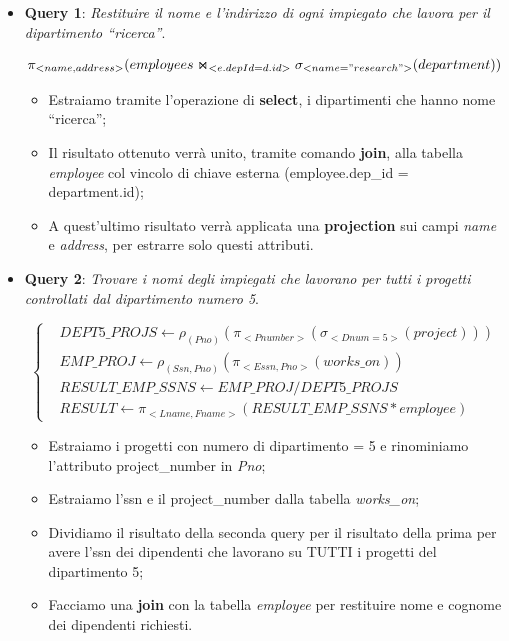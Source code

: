 \begin{itemize}

\item{\textbf{Query 1}}: \textit{Restituire il nome e l’indirizzo di ogni impiegato che lavora per il dipartimento “ricerca”}.

\[	
	\pi_{<name,address>}(employees \Join_{<e.depId=d.id>}\sigma_{<name="research">}(department))
\]

\begin{itemize}

\item Estraiamo tramite l’operazione di \textbf{select}, i dipartimenti che hanno nome “ricerca”;
\item Il risultato ottenuto verrà unito, tramite comando \textbf{join}, alla tabella \textit{employee} col vincolo di chiave esterna (employee.dep\_id = department.id);
\item A quest’ultimo risultato verrà applicata una \textbf{projection} sui campi \textit{name} e \textit{address}, per estrarre solo questi attributi.

\end{itemize}

\item{\textbf{Query 2}}: \textit{Trovare i nomi degli impiegati che lavorano per tutti i progetti controllati dal dipartimento numero 5}.

\[	
	\left\{
	\begin{aligned}
	&DEPT5\_PROJS \leftarrow \rho_{(Pno)}(\pi_{<Pnumber>}(\sigma_{<Dnum=5>}(project)))\\
	&EMP\_PROJ \leftarrow \rho_{(Ssn,Pno)}(\pi_{<Essn,Pno>}(works\_on))\\
	&RESULT\_EMP\_SSNS \leftarrow EMP\_PROJ / DEPT5\_PROJS\\
	&RESULT \leftarrow \pi_{<Lname,Fname>}(RESULT\_EMP\_SSNS * employee)
	\end{aligned}
	\right.
\]

\begin{itemize}

\item Estraiamo i progetti con numero di dipartimento = 5 e rinominiamo l’attributo project\_number in \textit{Pno};
\item Estraiamo l’ssn e il project\_number dalla tabella \textit{works\_on};
\item Dividiamo il risultato della seconda query per il risultato della prima per avere l’ssn dei dipendenti che lavorano su TUTTI i progetti del dipartimento 5;
\item Facciamo una \textbf{join} con la tabella \textit{employee} per restituire nome e cognome dei dipendenti richiesti.  


\end{itemize}
\end{itemize}

